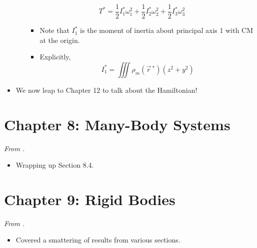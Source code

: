 \documentclass[../notes.tex]{subfiles}
\begin{document}
\begin{itemize}
\begin{itemize}
        \begin{equation*}
            T^* = \frac{1}{2}I_1^*\omega_1^2+\frac{1}{2}I_2^*\omega_2^2+\frac{1}{2}I_3^*\omega_3^2
        \end{equation*}
        \begin{itemize}
            \item Note that $I_1^*$ is the moment of inertia about principal axis 1 with CM at the origin.
            \item Explicitly,
            \begin{equation*}
                I_1^* = \iiint\rho_m(\vec{r}{\,}^*)(z^2+y^2)
            \end{equation*}
        \end{itemize}
    \end{itemize}
    \item We now leap to Chapter 12 to talk about the Hamiltonian!
\end{itemize}



\section{Chapter 8: Many-Body Systems}
\emph{From \textcite{bib:KibbleBerkshire}.}
\begin{itemize}
    \item {}Wrapping up Section 8.4.
\end{itemize}



\section{Chapter 9: Rigid Bodies}
\emph{From \textcite{bib:KibbleBerkshire}.}
\begin{itemize}
    \item Covered a smattering of results from various sections.
\end{itemize}
\end{document}
